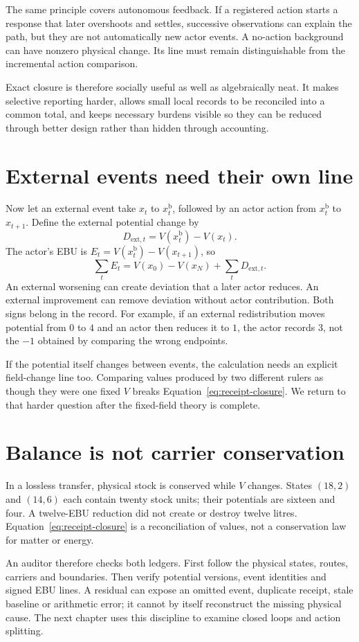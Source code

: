 The same principle covers autonomous feedback. If a registered action starts a response that later overshoots and settles, successive observations can explain the path, but they are not automatically new actor events. A no-action background can have nonzero physical change. Its line must remain distinguishable from the incremental action comparison.

Exact closure is therefore socially useful as well as algebraically neat. It makes selective reporting harder, allows small local records to be reconciled into a common total, and keeps necessary burdens visible so they can be reduced through better design rather than hidden through accounting.

\section{External events need their own line}
Now let an external event take $x_t$ to $x^{\mathrm{b}}_t$, followed by an actor action
from $x^{\mathrm{b}}_t$ to $x_{t+1}$. Define the external potential change by
\[
 D_{{\mathrm{ext}},t}=V(x^{\mathrm{b}}_t)-V(x_t).
\]
The actor's EBU is $E_t=V(x^{\mathrm{b}}_t)-V(x_{t+1})$, so
\begin{equation}\label{eq:driven-closure}
 \sum_t E_t=V(x_0)-V(x_N)+\sum_tD_{{\mathrm{ext}},t}.
\end{equation}
An external worsening can create deviation that a later actor reduces.
An external improvement can remove deviation without actor contribution.
Both signs belong in the record. For example, if an external redistribution
moves potential from $0$ to $4$ and an actor then reduces it to $1$, the
actor records $3$, not the $-1$ obtained by comparing the wrong endpoints.

If the potential itself changes between events, the calculation needs an
explicit field-change line too. Comparing values produced by two different
rulers as though they were one fixed $V$ breaks Equation~\ref{eq:receipt-closure}.
We return to that harder question after the fixed-field theory is complete.

\section{Balance is not carrier conservation}
In a lossless transfer, physical stock is conserved while $V$ changes.
States $(18,2)$ and $(14,6)$ each contain twenty stock units; their
potentials are sixteen and four. A twelve-EBU reduction did not create or
destroy twelve litres. Equation~\ref{eq:receipt-closure} is a reconciliation
of values, not a conservation law for matter or energy.

An auditor therefore checks both ledgers. First follow the physical states,
routes, carriers and boundaries. Then verify potential versions, event
identities and signed EBU lines. A residual can expose an omitted event,
duplicate receipt, stale baseline or arithmetic error; it cannot by itself
reconstruct the missing physical cause. The next chapter uses this discipline
to examine closed loops and action splitting.
